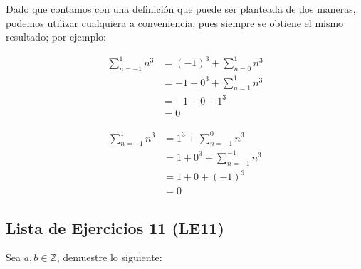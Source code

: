 \documentclass[11pt]{article}
\newcommand{\Z}{\mathbb{Z}}
\begin{document}
Dado que contamos con una definición que puede ser planteada de dos maneras, podemos utilizar cualquiera a conveniencia, pues siempre se obtiene el mismo resultado; por ejemplo:
\begin{center}
  \begin{minipage}[c]{.5\linewidth}
    \begin{align*}
      \sum_{n=-1}^{1} n^3 &= (-1)^3 + \sum_{n=0}^{1} n^3\\
      &= -1 + 0^3 + \sum_{n=1}^1 n^3\\
      &= -1 + 0 + 1^3\\
      &= 0
    \end{align*}
   \end{minipage}%
  \begin{minipage}[c]{.5\linewidth}
    \begin{align*}
      \sum_{n=-1}^{1} n^3 &= 1^3 + \sum_{n=-1}^{0} n^3\\
      &= 1 + 0^3 + \sum_{n=-1}^{-1} n^3\\
      &= 1 + 0 + (-1)^3\\
      &= 0
    \end{align*}
  \end{minipage}
  \end{center}

\subsection*{Lista de Ejercicios 11 (LE11)}

Sea $a,b\in \Z$, demuestre lo siguiente:
\end{document}
